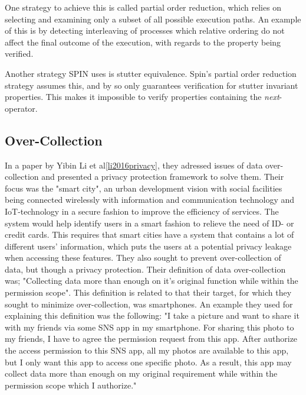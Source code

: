 One strategy to achieve this is called partial order reduction, which relies on selecting and examining only a subset of all possible execution paths. An example of this is by detecting interleaving of processes which relative ordering do not affect the final outcome of the execution, with regards to the property being verified. 

Another strategy SPIN uses is stutter equivalence.  Spin's partial order reduction strategy assumes this, and by so only guarantees verification for stutter invariant properties. This makes it impossible to verify properties containing the \textit{next}-operator.


\subsection{Over-Collection}


In a paper by Yibin Li et al\ref{li2016privacy}, they adressed issues of data over-collection and presented a privacy protection framework to solve them. Their focus was the "smart city", an urban development vision with social facilities being connected wirelessly with information and communication technology and IoT-technology in a secure fashion to improve the efficiency of services. The system would help identify users in a smart fashion to relieve the need of ID- or credit cards. This requires that smart cities have a system that contains a lot of different users' information, which puts the users at a potential privacy leakage when accessing these features. They also sought to prevent over-collection of data, but though a privacy protection. Their definition of data over-collection was; "Collecting data more than enough on it's original function while within the permission scope". This definition is related to that their target, for which they sought to minimize over-collection, was smartphones. An example they used for explaining this definition was the following: "I take a picture and want to share it with my friends via some SNS app in my smartphone. For sharing this photo to my friends, I have to agree the permission request from this app. After authorize the access permission to this SNS app, all my photos are available to this app, but I only want this app to access one specific photo. As a result, this app may collect data more than enough on my original requirement while within the permission scope which I authorize."

